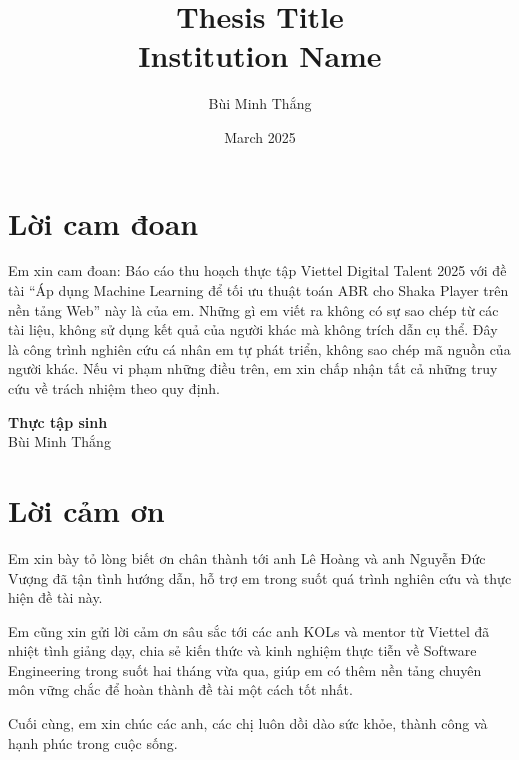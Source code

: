 \documentclass[12pt]{report}
\title{
    {Thesis Title}\\
    {\large Institution Name}\\
}
\author{Bùi Minh Thắng}
\date{March 2025}
\begin{document}




\chapter*{Lời cam đoan}
Em xin cam đoan: Báo cáo thu hoạch thực tập Viettel Digital Talent 2025 với đề tài “Áp dụng Machine Learning để tối ưu thuật toán ABR cho Shaka Player trên nền tảng Web” này là của em. Những gì em viết ra không có sự sao chép từ các tài liệu, không sử dụng kết quả của người khác mà không trích dẫn cụ thể. Đây là công trình nghiên cứu cá nhân em tự phát triển, không sao chép mã nguồn của người khác. Nếu vi phạm những điều trên, em xin chấp nhận tất cả những truy cứu về trách nhiệm theo quy định.

\vspace{2cm} %
\noindent
\hfill
\begin{minipage}{0.4\textwidth}
    \centering
    \textbf{Thực tập sinh}\\[1cm] %
    Bùi Minh Thắng
\end{minipage}

\chapter*{Lời cảm ơn}
Em xin bày tỏ lòng biết ơn chân thành tới anh Lê Hoàng và anh Nguyễn Đức Vượng đã tận tình hướng dẫn, hỗ trợ em trong suốt quá trình nghiên cứu và thực hiện đề tài này.

Em cũng xin gửi lời cảm ơn sâu sắc tới các anh KOLs và mentor từ Viettel đã nhiệt tình giảng dạy, chia sẻ kiến thức và kinh nghiệm thực tiễn về Software Engineering trong suốt hai tháng vừa qua, giúp em có thêm nền tảng chuyên môn vững chắc để hoàn thành đề tài một cách tốt nhất.

Cuối cùng, em xin chúc các anh, các chị luôn dồi dào sức khỏe, thành công và hạnh phúc trong cuộc sống.


\end{document}
